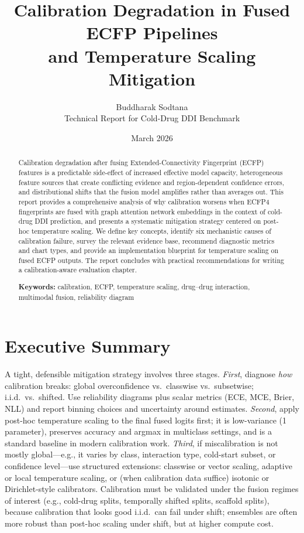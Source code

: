 \documentclass[11pt,a4paper,twocolumn]{article}
\title{Calibration Degradation in Fused ECFP Pipelines\\
       and Temperature Scaling Mitigation}
\author{Buddharak Sodtana\\[0.5em]
        \small Technical Report for Cold-Drug DDI Benchmark}
\date{March 2026}
\begin{document}
\onecolumn
\maketitle

\begin{abstract}
Calibration degradation after fusing Extended-Connectivity Fingerprint
(ECFP) features is a predictable side-effect of increased effective model
capacity, heterogeneous feature sources that create conflicting evidence and
region-dependent confidence errors, and distributional shifts that the
fusion model amplifies rather than averages out.
This report provides a comprehensive analysis of why calibration worsens
when ECFP4 fingerprints are fused with graph attention network embeddings
in the context of cold-drug DDI prediction, and presents a systematic
mitigation strategy centered on post-hoc temperature scaling.
We define key concepts, identify six mechanistic causes of calibration
failure, survey the relevant evidence base, recommend diagnostic metrics
and chart types, and provide an implementation blueprint for temperature
scaling on fused ECFP outputs.
The report concludes with practical recommendations for writing a
calibration-aware evaluation chapter.

\noindent\textbf{Keywords:} calibration, ECFP, temperature scaling,
drug--drug interaction, multimodal fusion, reliability diagram
\end{abstract}

\tableofcontents
\vspace{8pt}
\twocolumn

\section{Executive Summary}

A tight, defensible mitigation strategy involves three stages.
\textit{First}, diagnose \textit{how} calibration breaks: global
overconfidence vs.\ classwise vs.\ subsetwise; i.i.d.\ vs.\ shifted.
Use reliability diagrams plus scalar metrics (ECE, MCE, Brier, NLL) and
report binning choices and uncertainty around estimates.
\textit{Second}, apply post-hoc temperature scaling to the final fused
logits first; it is low-variance (1 parameter), preserves accuracy and
argmax in multiclass settings, and is a standard baseline in modern
calibration work.
\textit{Third}, if miscalibration is not mostly global---e.g., it varies
by class, interaction type, cold-start subset, or confidence
level---use structured extensions: classwise or vector scaling, adaptive
or local temperature scaling, or (when calibration data suffice) isotonic
or Dirichlet-style calibrators.
Calibration must be validated under the fusion regimes of interest (e.g.,
cold-drug splits, temporally shifted splits, scaffold splits), because
calibration that looks good i.i.d.\ can fail under shift; ensembles are
often more robust than post-hoc scaling under shift, but at higher
compute cost.
\end{document}

